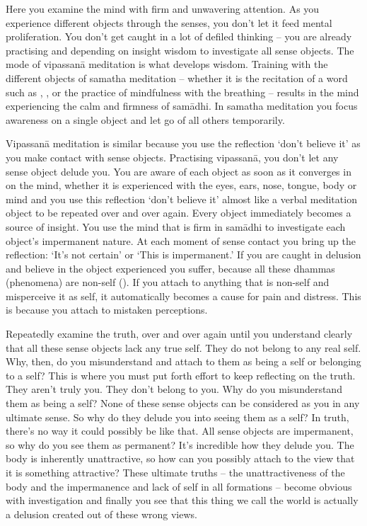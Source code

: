 Here you examine the mind with firm and unwavering attention. As you experience different objects through the senses, you don't let it feed mental proliferation. You don't get caught in a lot of defiled thinking -- you are already practising  and depending on insight wisdom to investigate all sense objects. The mode of vipassan\=a meditation is what develops wisdom. Training with the different objects of samatha meditation -- whether it is the recitation of a word such as , ,  or the practice of mindfulness with the breathing -- results in the mind experiencing the calm and firmness of sam\=adhi. In samatha meditation you focus awareness on a single object and let go of all others temporarily.

Vipassan\=a meditation is similar because you use the reflection `don't believe it' as you make contact with sense objects. Practising vipassan\=a, you don't let any sense object delude you. You are aware of each object as soon as it converges in on the mind, whether it is experienced with the eyes, ears, nose, tongue, body or mind and you use this reflection `don't believe it' almost like a verbal meditation object to be repeated over and over again. Every object immediately becomes a source of insight. You use the mind that is firm in sam\=adhi to investigate each object's impermanent nature. At each moment of sense contact you bring up the reflection: `It's not certain' or `This is impermanent.' If you are caught in delusion and believe in the object experienced you suffer, because all these dhammas (phenomena) are non-self (). If you attach to anything that is non-self and misperceive it as self, it automatically becomes a cause for pain and distress. This is because you attach to mistaken perceptions.

Repeatedly examine the truth, over and over again until you understand clearly that all these sense objects lack any true self. They do not belong to any real self. Why, then, do you misunderstand and attach to them as being a self or belonging to a self? This is where you must put forth effort to keep reflecting on the truth. They aren't truly you. They don't belong to you. Why do you misunderstand them as being a self? None of these sense objects can be considered as you in any ultimate sense. So why do they delude you into seeing them as a self? In truth, there's no way it could possibly be like that. All sense objects are impermanent, so why do you see them as permanent? It's incredible how they delude you. The body is inherently unattractive, so how can you possibly attach to the view that it is something attractive? These ultimate truths -- the unattractiveness of the body and the impermanence and lack of self in all formations -- become obvious with investigation and finally you see that this thing we call the world is actually a delusion created out of these wrong views.

